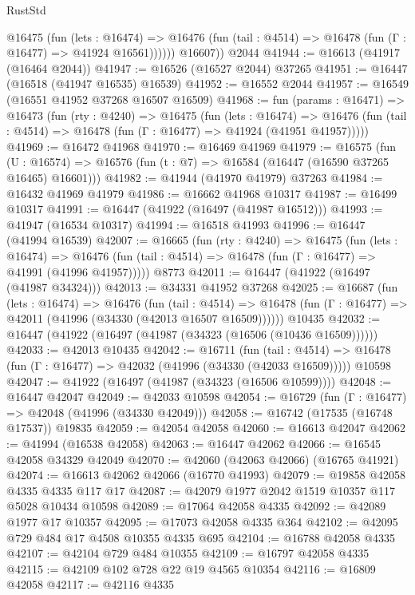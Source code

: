 \begin{lexlean}{RustStd}
\begin{coremodule}
{\begin{coremodule}
{{{{{{{{{{{{{{{{{{{{{{{{{{{{{{{{{{{{{{{{{{{{{{{{{{{{{{{            @16475
              (fun (lets : @16474) =>
              @16476 (fun (tail : @4514) => @16478 (fun (Γ : @16477) => @41924 @16561))))))
        @16607))
    @2044
@41944 := @16613 (@41917 (@16464 @2044))
@41947 := @16526 (@16527 @2044) @37265
@41951 := @16447 (@16518 (@41947 @16535) @16539)
@41952 := @16552 @2044
@41957 := @16549 (@16551 @41952 @37268 @16507 @16509)
@41968 := fun (params : @16471) =>
  @16473
    (fun (rty : @4240) =>
    @16475
      (fun (lets : @16474) =>
      @16476 (fun (tail : @4514) => @16478 (fun (Γ : @16477) => @41924 (@41951 @41957)))))
@41969 := @16472 @41968
@41970 := @16469 @41969
@41979 := @16575
    (fun (U : @16574) => @16576 (fun (t : @7) => @16584 (@16447 (@16590 @37265 @16465) @16601)))
@41982 := @41944 (@41970 @41979) @37263
@41984 := @16432 @41969 @41979
@41986 := @16662 @41968 @10317
@41987 := @16499 @10317
@41991 := @16447 (@41922 (@16497 (@41987 @16512)))
@41993 := @41947 (@16534 @10317)
@41994 := @16518 @41993
@41996 := @16447 (@41994 @16539)
@42007 := @16665
    (fun (rty : @4240) =>
    @16475
      (fun (lets : @16474) =>
      @16476 (fun (tail : @4514) => @16478 (fun (Γ : @16477) => @41991 (@41996 @41957)))))
    @8773
@42011 := @16447 (@41922 (@16497 (@41987 @34324)))
@42013 := @34331 @41952 @37268
@42025 := @16687
    (fun (lets : @16474) =>
    @16476
      (fun (tail : @4514) =>
      @16478 (fun (Γ : @16477) => @42011 (@41996 (@34330 (@42013 @16507 @16509))))))
    @10435
@42032 := @16447 (@41922 (@16497 (@41987 (@34323 (@16506 (@10436 @16509))))))
@42033 := @42013 @10435
@42042 := @16711
    (fun (tail : @4514) => @16478 (fun (Γ : @16477) => @42032 (@41996 (@34330 (@42033 @16509)))))
    @10598
@42047 := @41922 (@16497 (@41987 (@34323 (@16506 @10599))))
@42048 := @16447 @42047
@42049 := @42033 @10598
@42054 := @16729 (fun (Γ : @16477) => @42048 (@41996 (@34330 @42049)))
@42058 := @16742 (@17535 (@16748 @17537)) @19835
@42059 := @42054 @42058
@42060 := @16613 @42047
@42062 := @41994 (@16538 @42058)
@42063 := @16447 @42062
@42066 := @16545 @42058 @34329 @42049
@42070 := @42060 (@42063 @42066) (@16765 @41921)
@42074 := @16613 @42062 @42066 (@16770 @41993)
@42079 := @19858 @42058 @4335 @4335 @117 @17
@42087 := @42079 @1977 @2042 @1519 @10357 @117 @5028 @10434 @10598
@42089 := @17064 @42058 @4335
@42092 := @42089 @1977 @17 @10357
@42095 := @17073 @42058 @4335 @364
@42102 := @42095 @729 @484 @17 @4508 @10355 @4335 @695
@42104 := @16788 @42058 @4335
@42107 := @42104 @729 @484 @10355
@42109 := @16797 @42058 @4335
@42115 := @42109 @102 @728 @22 @19 @4565 @10354
@42116 := @16809 @42058
@42117 := @42116 @4335
}}}}}}}}}}}}}}}}}}}}}}}}}}}}}}}}}}}}}}}}}}}}}}}}}}}}}}}
\end{coremodule}}
\end{coremodule}
\end{lexlean}
